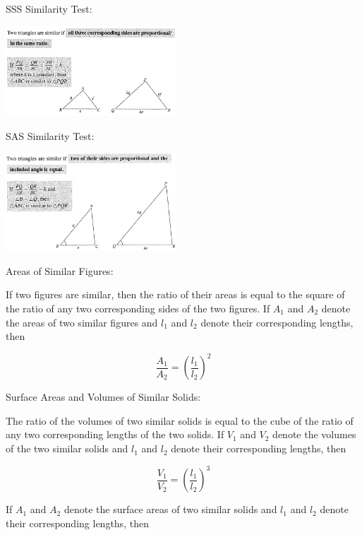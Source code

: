 \documentclass[twocolumn]{article}
\begin{document}
\bigskip 

\noindent 
SSS Similarity Test:

\includegraphics[width=0.48\textwidth]{97.png}

\bigskip 

\noindent 
SAS Similarity Test:

\includegraphics[width=0.48\textwidth]{98.png}

\bigskip 

\noindent 
Areas of Similar Figures:

\bigskip 

\noindent 
If two figures are similar, then the ratio of their areas is equal to the square of the ratio of any two corresponding sides of the two figures. If $A_1$ and $A_2$ denote the areas of two similar figures and $l_1$ and $l_2$ denote their corresponding lengths, then 

$$\frac{A_1}{A_2}=\left(\frac{l_1}{l_2}\right)^2$$

\bigskip 

\noindent 
Surface Areas and Volumes of Similar Solids:

\bigskip 

\noindent 
The ratio of the volumes of two similar solids is equal to the cube of the ratio of any two corresponding lengths of the two solids. If $V_1$ and $V_2$ denote the volumes of the two similar solids and $l_1$ and $l_2$ denote their corresponding lengths, then 

$$\frac{V_1}{V_2}=\left(\frac{l_1}{l_2}\right)^3$$

\bigskip 

\noindent 
If $A_1$ and $A_2$ denote the surface areas of two similar solids and $l_1$ and $l_2$ denote their corresponding lengths, then 
\end{document}
